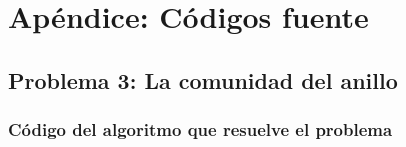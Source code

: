 \section{Apéndice: Códigos fuente}

\subsection{Problema 3: La comunidad del anillo}

\subsubsection{Código del algoritmo que resuelve el problema}
